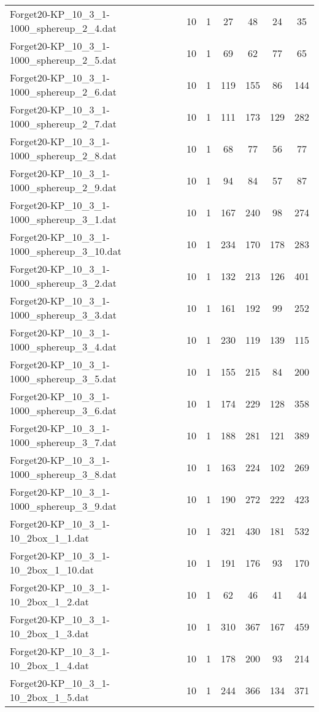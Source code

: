 \begin{table}[!ht]
\begin{tabular}{lcccccc}
Forget20-KP\_10\_3\_1-1000\_sphereup\_2\_4.dat & 10 & 1 & 27 & 48 & 24 & 35 \\
Forget20-KP\_10\_3\_1-1000\_sphereup\_2\_5.dat & 10 & 1 & 69 & 62 & 77 & 65 \\
Forget20-KP\_10\_3\_1-1000\_sphereup\_2\_6.dat & 10 & 1 & 119 & 155 & 86 & 144 \\
Forget20-KP\_10\_3\_1-1000\_sphereup\_2\_7.dat & 10 & 1 & 111 & 173 & 129 & 282 \\
Forget20-KP\_10\_3\_1-1000\_sphereup\_2\_8.dat & 10 & 1 & 68 & 77 & 56 & 77 \\
Forget20-KP\_10\_3\_1-1000\_sphereup\_2\_9.dat & 10 & 1 & 94 & 84 & 57 & 87 \\
Forget20-KP\_10\_3\_1-1000\_sphereup\_3\_1.dat & 10 & 1 & 167 & 240 & 98 & 274 \\
Forget20-KP\_10\_3\_1-1000\_sphereup\_3\_10.dat & 10 & 1 & 234 & 170 & 178 & 283 \\
Forget20-KP\_10\_3\_1-1000\_sphereup\_3\_2.dat & 10 & 1 & 132 & 213 & 126 & 401 \\
Forget20-KP\_10\_3\_1-1000\_sphereup\_3\_3.dat & 10 & 1 & 161 & 192 & 99 & 252 \\
Forget20-KP\_10\_3\_1-1000\_sphereup\_3\_4.dat & 10 & 1 & 230 & 119 & 139 & 115 \\
Forget20-KP\_10\_3\_1-1000\_sphereup\_3\_5.dat & 10 & 1 & 155 & 215 & 84 & 200 \\
Forget20-KP\_10\_3\_1-1000\_sphereup\_3\_6.dat & 10 & 1 & 174 & 229 & 128 & 358 \\
Forget20-KP\_10\_3\_1-1000\_sphereup\_3\_7.dat & 10 & 1 & 188 & 281 & 121 & 389 \\
Forget20-KP\_10\_3\_1-1000\_sphereup\_3\_8.dat & 10 & 1 & 163 & 224 & 102 & 269 \\
Forget20-KP\_10\_3\_1-1000\_sphereup\_3\_9.dat & 10 & 1 & 190 & 272 & 222 & 423 \\
Forget20-KP\_10\_3\_1-10\_2box\_1\_1.dat & 10 & 1 & 321 & 430 & 181 & 532 \\
Forget20-KP\_10\_3\_1-10\_2box\_1\_10.dat & 10 & 1 & 191 & 176 & 93 & 170 \\
Forget20-KP\_10\_3\_1-10\_2box\_1\_2.dat & 10 & 1 & 62 & 46 & 41 & 44 \\
Forget20-KP\_10\_3\_1-10\_2box\_1\_3.dat & 10 & 1 & 310 & 367 & 167 & 459 \\
Forget20-KP\_10\_3\_1-10\_2box\_1\_4.dat & 10 & 1 & 178 & 200 & 93 & 214 \\
Forget20-KP\_10\_3\_1-10\_2box\_1\_5.dat & 10 & 1 & 244 & 366 & 134 & 371 \\

\end{tabular}
\end{table}
